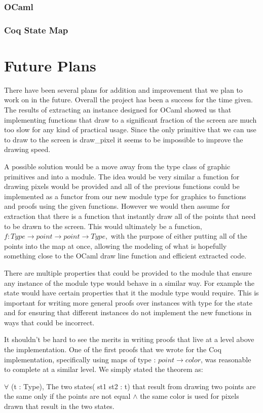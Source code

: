 \documentclass{llncs}
\begin{document}
  \subsubsection{OCaml}
  \subsubsection{Coq State Map}


\section{Future Plans}
There have been several plans for addition and improvement that we plan to work on in the future.  Overall the project has been a success for the
time given.  The results of extracting an instance designed for OCaml showed us that implementing functions that draw to a significant fraction of the screen are much too slow for any kind of practical usage.  Since the only primitive that we can use to draw to the screen is draw\_pixel it seems to be impossible to improve the drawing speed.

A possible solution would be a move away from the type class of graphic primitives and into a module.  The idea would be very similar a function for drawing pixels would be provided and all of the previous functions could be implemented as a functor from our new module type for graphics to functions and proofs using the given functions.  However we would then assume for extraction that there is a function that instantly draw all of the points that need to be drawn to the screen.  This would ultimately be a function, $f :Type \rightarrow point \rightarrow point \rightarrow Type,$ with the purpose of either putting all of the points into the map at once, allowing the modeling of what is hopefully something close to the OCaml draw line function and efficient extracted code.

There are multiple properties that could be provided to the module that ensure any instance of the module type would behave in a similar way.  For example the state would have certain properties that it the module type would require.  This is important for writing more general proofs over instances with type for the state and for ensuring that different instances do not implement the new functions in ways that could be incorrect.

It shouldn't be hard to see the merits in writing proofs that live at a level above the implementation.  One of the first proofs that we wrote for the Coq implementation, specifically using maps of type : $point \rightarrow color$, was reasonable to complete at a similar level.  We simply stated the theorem as:
\begin{theorem}
  $\forall$ (t : Type), The two states( st1 st2 : t) that result from drawing two points are the same only if the points are not equal $\land$ the same color is used for pixels drawn that result in the two states.
\end{theorem}
\end{document}
